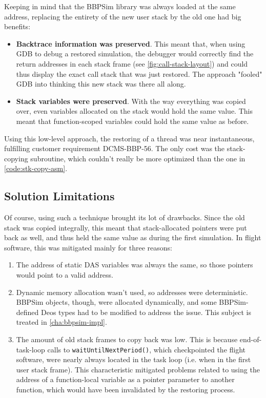 Keeping in mind that the \gls{BBPSim} library was always loaded at the same address, replacing the entirety of the new user stack by the old one had big benefits:
\begin{itemize}
	\item \textbf{Backtrace information was preserved}. This meant that, when using GDB to debug a restored simulation, the debugger would correctly find the return addresses in each stack frame (see \autoref{fig:call-stack-layout}) and could thus display the exact call stack that was just restored. The approach "fooled" GDB into thinking this new stack was there all along.
	\item \textbf{Stack variables were preserved}. With the way everything was copied over, even variables allocated on the stack would hold the same value. This meant that function-scoped variables could hold the same value as before.
\end{itemize}

Using this low-level approach, the restoring of a thread was near instantaneous, fulfilling customer requirement DCMS-BBP-56. The only cost was the stack-copying subroutine, which couldn't really be more optimized than the one in \autoref{code:stk-copy-asm}.

\subsection*{Solution Limitations}
Of course, using such a technique brought its lot of drawbacks. Since the old stack was copied integrally, this meant that stack-allocated pointers were put back as well, and thus held the same value as during the first simulation. In flight software, this was mitigated mainly for three reasons: 
\begin{enumerate}
	\item The address of static DAS variables was always the same, so those pointers would point to a valid address.
	\item Dynamic memory allocation wasn't used, so addresses were deterministic. BBPSim objects, though, were allocated dynamically, and some BBPSim-defined Deos types had to be modified to address the issue. This subject is treated in \autoref{cha:bbpsim-impl}. 
	\item The amount of old stack frames to copy back was low. This is because end-of-task-loop calls to \texttt{waitUntilNextPeriod()}, which checkpointed the flight software, were nearly always located in the task loop (i.e. when in the first user stack frame). This characteristic mitigated problems related to using the address of a function-local variable as a pointer parameter to another function, which would have been invalidated by the restoring process. 
\end{enumerate}

